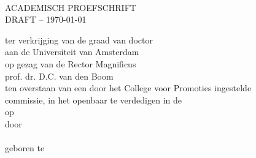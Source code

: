 
%
%

\pagestyle{empty}
\setlength\parindent{0pt}

\makeatletter
{}
\makeatother



\begin{minipage}[c][190mm][c]{124mm}  %
\makeatletter
\begin{center}
	\vspace*{1.2cm}

	{ \huge \bf \@title }\\[2.7cm]

	\textsc{\Large ACADEMISCH PROEFSCHRIFT}\\[1.2cm]
	\ifdraft \textsc{\Large DRAFT -- \today}\\[1.0cm] \fi
	
	\linespread{1.2}
	\large \textrm{
		ter verkrijging van de graad van doctor \\
		aan de Universiteit van Amsterdam \\
		op gezag van de Rector Magnificus \\
		prof. dr. D.C. van den Boom \\
		ten overstaan van een door het College voor Promoties ingestelde \\
		commissie, in het openbaar te verdedigen in de \@location \\
		op \@date \\ 
		\vspace{0.9cm}
		door \\[0.3cm]
		\vspace{0.9cm}
		{\bf \@author}\\[0.3cm]
		geboren te \@birthplace \\[0.3cm]  
	 }
\end{center}
\makeatother
\end{minipage}

